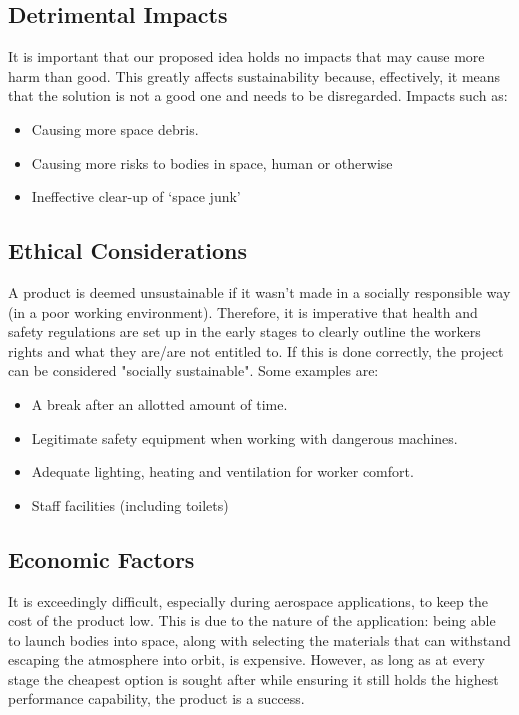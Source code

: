 \documentclass{article}
\begin{document}
\subsection{Detrimental Impacts}
It is important that our proposed idea holds no impacts that may cause more harm than good. This greatly affects sustainability because, effectively, it means that the solution is not a good one and needs to be disregarded. 
Impacts such as:
\begin{itemize}
    \item Causing more space debris.
    \item Causing more risks to bodies in space, human or otherwise
    \item Ineffective clear-up of ‘space junk’
\end{itemize}

\subsection{Ethical Considerations}
A product is deemed unsustainable if it wasn't made in a socially responsible way (in a poor working environment). 
Therefore, it is imperative that health and safety regulations are set up in the early stages to clearly outline the workers rights and what they are/are not entitled to. If this is done correctly, the project can be considered "socially sustainable". Some examples \cite{TUC} are:
\begin{itemize}
    \item A break after an allotted amount of time.
    \item Legitimate safety equipment when working with dangerous machines.
    \item Adequate lighting, heating and ventilation for worker comfort.
    \item Staff facilities (including toilets)
\end{itemize}

\subsection{Economic Factors}
It is exceedingly difficult, especially during aerospace applications, to keep the cost of the product low. This is due to the nature of the application: being able to launch bodies into space, along with selecting the materials that can withstand escaping the atmosphere into orbit, is expensive. 
However, as long as at every stage the cheapest option is sought after while ensuring it still holds the highest performance capability, the product is a success.
\end{document}
